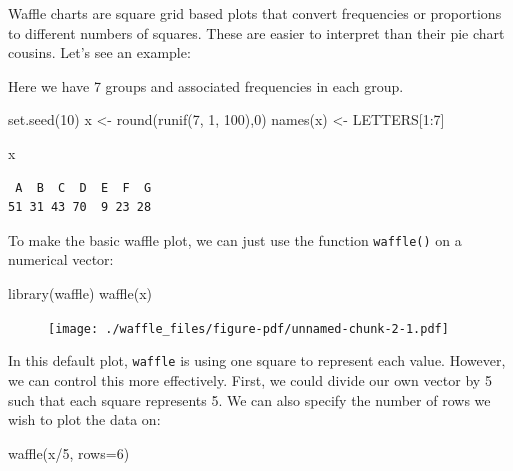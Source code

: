 \documentclass[
  letterpaper,
  DIV=11,
  numbers=noendperiod]{scrreprt}
\newenvironment{Shaded}{\begin{snugshade}}{\end{snugshade}}
\newcommand{\AttributeTok}[1]{\textcolor[rgb]{0.40,0.45,0.13}{#1}}
\newcommand{\DecValTok}[1]{\textcolor[rgb]{0.68,0.00,0.00}{#1}}
\newcommand{\FunctionTok}[1]{\textcolor[rgb]{0.28,0.35,0.67}{#1}}
\newcommand{\NormalTok}[1]{\textcolor[rgb]{0.00,0.23,0.31}{#1}}
\newcommand{\OtherTok}[1]{\textcolor[rgb]{0.00,0.23,0.31}{#1}}
\newcommand{\SpecialCharTok}[1]{\textcolor[rgb]{0.37,0.37,0.37}{#1}}
\begin{document}
Waffle charts are square grid based plots that convert frequencies or
proportions to different numbers of squares. These are easier to
interpret than their pie chart cousins. Let's see an example:

Here we have 7 groups and associated frequencies in each group.

\begin{Shaded}
\begin{Highlighting}[]
\FunctionTok{set.seed}\NormalTok{(}\DecValTok{10}\NormalTok{)}
\NormalTok{x }\OtherTok{\textless{}{-}} \FunctionTok{round}\NormalTok{(}\FunctionTok{runif}\NormalTok{(}\DecValTok{7}\NormalTok{, }\DecValTok{1}\NormalTok{, }\DecValTok{100}\NormalTok{),}\DecValTok{0}\NormalTok{)}
\FunctionTok{names}\NormalTok{(x) }\OtherTok{\textless{}{-}}\NormalTok{ LETTERS[}\DecValTok{1}\SpecialCharTok{:}\DecValTok{7}\NormalTok{]}

\NormalTok{x}
\end{Highlighting}
\end{Shaded}

\begin{verbatim}
 A  B  C  D  E  F  G 
51 31 43 70  9 23 28 
\end{verbatim}

To make the basic waffle plot, we can just use the function
\texttt{waffle()} on a numerical vector:

\begin{Shaded}
\begin{Highlighting}[]
\FunctionTok{library}\NormalTok{(waffle)}
\FunctionTok{waffle}\NormalTok{(x)}
\end{Highlighting}
\end{Shaded}

\begin{figure}[H]

{\centering \texttt{[image: ./waffle\_files/figure-pdf/unnamed-chunk-2-1.pdf]}

}

\end{figure}

In this default plot, \texttt{waffle} is using one square to represent
each value. However, we can control this more effectively. First, we
could divide our own vector by 5 such that each square represents 5. We
can also specify the number of rows we wish to plot the data on:

\begin{Shaded}
\begin{Highlighting}[]
\FunctionTok{waffle}\NormalTok{(x}\SpecialCharTok{/}\DecValTok{5}\NormalTok{, }\AttributeTok{rows=}\DecValTok{6}\NormalTok{)}
\end{Highlighting}
\end{Shaded}
\end{document}
